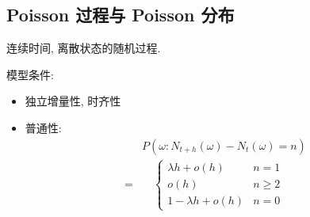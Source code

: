 \documentclass[11pt,a4paper,twocolumn]{article} %
\numberwithin{equation}{section} %
\begin{document}
\subsection{Poisson 过程与 Poisson 分布} %
\label{sub:poisson}
连续时间, 离散状态的随机过程. 

模型条件: 
\begin{itemize}
	\item 独立增量性, 时齐性
	\item 普通性: 
	\begin{align*}
		&P(\omega: N_{t+h}(\omega) - N_t(\omega) = n) \\
		= &\quad\begin{cases}
			\lambda h + o(h) & n = 1\\
			o(h) & n\ge 2\\
			1-\lambda h + o(h) & n=0
		\end{cases}
	\end{align*}
\end{itemize}
\end{document}
